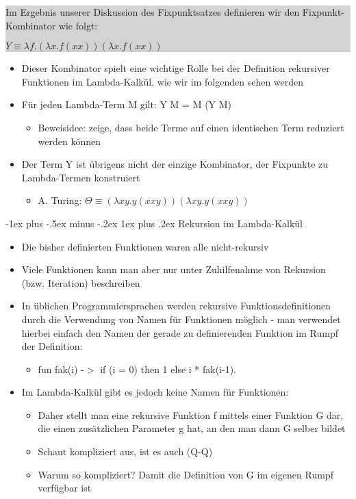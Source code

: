 \documentclass[10pt]{article}
\makeatletter
\renewcommand{\subsubsection}{\@startsection{subsubsection}{3}{0mm}%
                                {-1ex plus -.5ex minus -.2ex}%
                                {1ex plus .2ex}%
                                {\normalfont\small\bfseries}}
\makeatother
\begin{document}
\colorbox{lightgray}{
  \begin{minipage}[h]{1.0\linewidth}
    Im Ergebnis unserer Diskussion des Fixpunktsatzes definieren wir den Fixpunkt-Kombinator wie folgt: \\
    \begin{center}
      $Y \equiv \lambda f.(\lambda x.f(xx)) (\lambda x.f(xx))$
    \end{center}
  \end{minipage}
}
\begin{itemize}
  \item Dieser Kombinator spielt eine wichtige Rolle bei der Definition rekursiver Funktionen im Lambda-Kalkül, wie wir im folgenden sehen werden
  \item Für jeden Lambda-Term M gilt: Y M = M (Y M)
        \begin{itemize}
          \item Beweisidee: zeige, dass beide Terme auf einen identischen Term reduziert werden können
        \end{itemize}
  \item Der Term Y ist übrigens nicht der einzige Kombinator, der Fixpunkte zu Lambda-Termen konstruiert
        \begin{itemize}
          \item A. Turing: $\Theta \equiv (\lambda xy.y(xxy)) (\lambda xy.y(xxy))$
        \end{itemize}
\end{itemize}

\subsubsection{Rekursion im Lambda-Kalkül}
\begin{itemize}
  \item Die bisher definierten Funktionen waren alle nicht-rekursiv
  \item Viele Funktionen kann man aber nur unter Zuhilfenahme von Rekursion (bzw. Iteration) beschreiben
  \item In üblichen Programmiersprachen werden rekursive Funktionsdefinitionen durch die Verwendung von Namen für Funktionen möglich - man verwendet hierbei einfach den Namen der gerade zu definierenden Funktion im Rumpf der Definition:
        \begin{itemize}
          \item fun fak(i) -$>$ if (i = 0) then 1 else i * fak(i-1).
        \end{itemize}
  \item Im Lambda-Kalkül gibt es jedoch keine Namen für Funktionen:
        \begin{itemize}
          \item Daher stellt man eine rekursive Funktion f mittels einer Funktion G dar, die einen zusätzlichen Parameter g hat, an den man dann G selber bildet
          \item Schaut kompliziert aus, ist es auch (Q-Q)
          \item Warum so kompliziert? Damit die Definition von G im eigenen Rumpf verfügbar ist
                
        \end{itemize}
\end{itemize}
\end{document}
